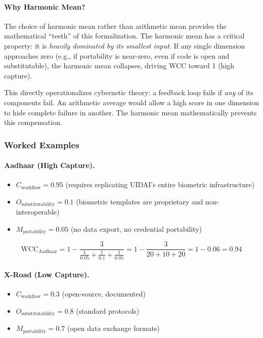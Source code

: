 \documentclass[11pt,a4paper]{article}
\theoremstyle{definition}
\begin{document}
\paragraph{Why Harmonic Mean?} The choice of harmonic mean rather than arithmetic mean provides the mathematical ``teeth'' of this formalization. The harmonic mean has a critical property: it is \textit{heavily dominated by its smallest input}. If any single dimension approaches zero (e.g., if portability is near-zero, even if code is open and substitutable), the harmonic mean collapses, driving WCC toward 1 (high capture).

This directly operationalizes cybernetic theory: a feedback loop fails if \textit{any} of its components fail. An arithmetic average would allow a high score in one dimension to hide complete failure in another. The harmonic mean mathematically prevents this compensation.

\subsubsection{Worked Examples}

\paragraph{Aadhaar (High Capture).}
\begin{itemize}[noitemsep]
    \item $C_{\text{workflow}} = 0.95$ (requires replicating UIDAI's entire biometric infrastructure)
    \item $O_{\text{substitutability}} = 0.1$ (biometric templates are proprietary and non-interoperable)
    \item $M_{\text{portability}} = 0.05$ (no data export, no credential portability)
\end{itemize}

\begin{equation}
\text{WCC}_{\text{Aadhaar}} = 1 - \frac{3}{\frac{1}{0.05} + \frac{1}{0.1} + \frac{1}{0.05}} = 1 - \frac{3}{20 + 10 + 20} = 1 - 0.06 = \mathbf{0.94}
\end{equation}

\paragraph{X-Road (Low Capture).}
\begin{itemize}[noitemsep]
    \item $C_{\text{workflow}} = 0.3$ (open-source, documented)
    \item $O_{\text{substitutability}} = 0.8$ (standard protocols)
    \item $M_{\text{portability}} = 0.7$ (open data exchange formats)
\end{itemize}
\end{document}

